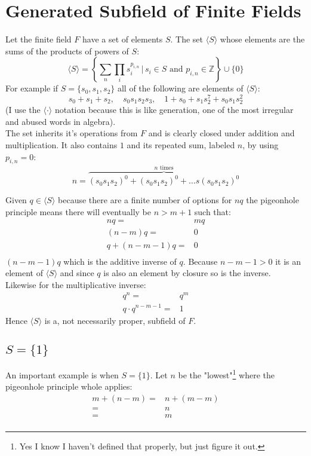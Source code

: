 
\section{Generated Subfield of Finite Fields}
Let the finite field $F$ have a set of elements $S$.
The set $\langle S \rangle$ whose elements are the sums of the products of powers of $S$:
\[\langle S \rangle = \left\{\sum_n\prod_i s_i^{p_{i,n}}\,|\,s_i\in S \text{ and } p_{i,n}\in \mathbb{Z}\right\}\cup\{0\}\]
For example if $S = \{s_0,s_1,s_2\}$ all of the following are elements of $\langle S \rangle$:
\[s_0+s_1+s_2,\quad s_0s_1s_2s_3,\quad 1+s_0+s_1s_2^7+s_0s_1s_2^2\]
(I use the $\langle \cdot \rangle$ notation because this is like generation,
one of the most irregular and abused words in algebra).
\\

The set inherits it's operations from $F$ and is clearly closed under addition and multiplication.
It also contains $1$ and its repeated sum, labeled $n$, by using $p_{i,n} = 0$:
\[n = \overbrace{(s_0s_1s_2)^0+(s_0s_1s_2)^0+\dots s(s_0s_1s_2)^0}^{n \text{ times}}\]

Given $q\in \langle S \rangle$ because there are a finite number of options for $nq$ the pigeonhole principle means there will eventually be $n > m+1$ such that:
\begin{equation*}
\begin{aligned}
nq =& mq\\
(n-m)q =& 0\\
q+(n-m-1)q=& 0\\
\end{aligned}
\end{equation*}
$(n-m-1)q$ which is the additive inverse of $q$.
Because $n-m-1 > 0$ it is an element of $\langle S \rangle$ and since $q$ is also an element by closure so is the inverse.
\\

Likewise for the multiplicative inverse:
\begin{equation*}
\begin{aligned}
q^n=&q^m\\
q\cdot q^{n-m-1}=&1
\end{aligned}
\end{equation*}
Hence $\langle S \rangle$ is a, not necessarily proper, subfield of $F$.

\subsection{$S=\{1\}$}
An important example is when $S=\{1\}$.
Let $n$ be the "lowest"\footnote{Yes I know I haven't defined that properly, but just figure it out.} where the pigeonhole principle whole applies:
\begin{equation*}
\begin{aligned}
	m + (n-m) =& n+(m-m)\\
	=& n \\
	=& m \\
\end{aligned}
\end{equation*}

